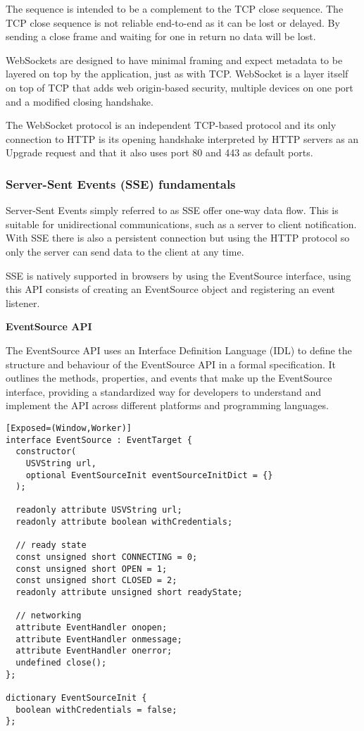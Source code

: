 The sequence is intended to be a complement to the TCP close sequence. The TCP close sequence is not reliable end-to-end as it can be lost or delayed. By sending a close frame and waiting for one in return no data will be lost.

WebSockets are designed to have minimal framing and expect metadata to be layered on top by the application, just as with TCP. WebSocket is a layer itself on top of TCP that adds web origin-based security, multiple devices on one port and a modified closing handshake.

The WebSocket protocol is an independent TCP-based protocol and its only connection to HTTP is its opening handshake interpreted by HTTP servers as an Upgrade request and that it also uses port 80 and 443 as default ports. \cite{ws-rfc}

\subsubsection{Server-Sent Events (SSE) fundamentals}

Server-Sent Events simply referred to as SSE offer one-way data flow. This is suitable for unidirectional communications, such as a server to client notification. With SSE there is also a persistent connection but using the HTTP protocol so only the server can send data to the client at any time.

SSE is natively supported in browsers by using the EventSource interface, using this API consists of creating an EventSource object and registering an event listener. \cite{html-spec-sse}

\textbf{EventSource API}

The EventSource API uses an Interface Definition Language (IDL) to define the structure and behaviour of the EventSource API in a formal specification. It outlines the methods, properties, and events that make up the EventSource interface, providing a standardized way for developers to understand and implement the API across different platforms and programming languages. \cite{html-spec-sse}

\begin{lstlisting}[caption=EventSource API IDL]
[Exposed=(Window,Worker)]
interface EventSource : EventTarget {
  constructor(
    USVString url,
    optional EventSourceInit eventSourceInitDict = {}
  );

  readonly attribute USVString url;
  readonly attribute boolean withCredentials;

  // ready state
  const unsigned short CONNECTING = 0;
  const unsigned short OPEN = 1;
  const unsigned short CLOSED = 2;
  readonly attribute unsigned short readyState;

  // networking
  attribute EventHandler onopen;
  attribute EventHandler onmessage;
  attribute EventHandler onerror;
  undefined close();
};

dictionary EventSourceInit {
  boolean withCredentials = false;
};
\end{lstlisting}

